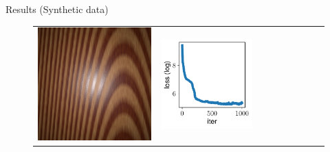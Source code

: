 \documentclass[final]{beamer}
\newlength{\twocolwid}
\newlength{\resultwidth}
\begin{document}
\begin{frame}[t]
\begin{columns}[t]
\begin{column}{\twocolwid}
\begin{block}{Results (Synthetic data)}
\begin{figure}[t]
\begin{tabular}{ccrclcccc}
            		\includegraphics[width=\resultwidth]{images/synth/wood/target.jpg} &
            		\includegraphics[width=\resultwidth]{images/synth/wood/loss.pdf} &

\end{tabular}
\end{figure}
\end{block}
\end{column}
\end{columns}
\end{frame}
\end{document}
